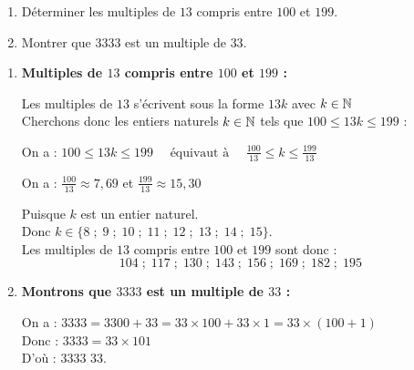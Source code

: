 \documentclass[10pt, a4paper]{article}
\begin{document}
\begin{Application}[][15 min]
\begin{enumerate}[leftmargin=*,itemsep=0.5pt]
    \item Déterminer les multiples de $13$ compris entre $100$ et $199$.
    \item Montrer que $3333$ est un multiple de $33$.
\end{enumerate}
\end{Application}

\begin{Solution}[APPLICATION][4]
\begin{enumerate}[leftmargin=*,itemsep=0.5pt]
    \item \textbf{Multiples de $13$ compris entre $100$ et $199$ :}

    Les multiples de $13$ s’écrivent sous la forme $13k$ avec $k \in \mathbb{N}$ \\
    Cherchons donc les entiers naturels $k \in \mathbb{N}$ tels que $100 \leq 13k \leq 199$ : 
    
    On a : $100 \leq 13k \leq 199 \quad \text{ équivaut à } \quad \frac{100}{13} \leq k \leq \frac{199}{13}$ 
    
    On a : $\frac{100}{13} \approx 7{,}69$ \quad et \quad $\frac{199}{13} \approx 15{,}30$ 
    
    Puisque $k$ est un entier naturel. \\
    Donc $k \in \big\{8 \; ; \; 9 \; ; \; 10 \; ; \; 11 \; ; \; 12 \; ; \; 13 \; ; \; 14 \; ; \; 15\big\}$. \\
    Les multiples de $13$ compris entre $100$ et $199$ sont donc : \\
    \[104 \; ; \; 117 \; ; \; 130 \; ; \; 143 \; ; \; 156 \; ; \; 169 \; ; \; 182 \; ; \; 195\]

    \item \textbf{Montrons que $3333$ est un multiple de $33$ :}
    
    On a :
    $3333 = 3300 + 33 = 33 \times 100 + 33 \times 1 = 33 \times (100 + 1)$ \\
    Donc : $3333 = 33 \times 101$ \\
    D'où : \quad $3333$  $33$.
\end{enumerate}
\end{Solution}
\end{document}
